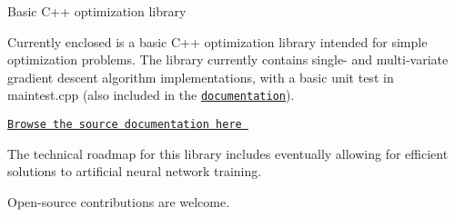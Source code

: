 Basic C++ optimization library

Currently enclosed is a basic C++ optimization library intended for simple optimization problems. The library currently contains single-\/ and multi-\/variate gradient descent algorithm implementations, with a basic unit test in maintest.\+cpp (also included in the \href{https://charelstoncrabb.github.io/basic_opt/html/index.html}{\tt documentation}).

\href{https://charelstoncrabb.github.io/basic_opt/html/index.html}{\tt Browse the source documentation here }

The technical roadmap for this library includes eventually allowing for efficient solutions to artificial neural network training.

Open-\/source contributions are welcome. 
